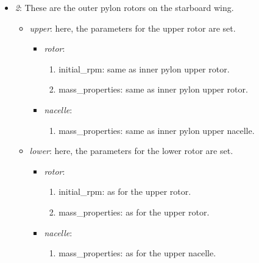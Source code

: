 \documentclass[report]{nrel}
\begin{document}
\begin{itemize}
\begin{itemize}
\begin{itemize}
\begin{itemize}
\begin{enumerate}
				\end{enumerate}
		\end{itemize}
	\end{itemize}
	\item \emph{2}:	These are the outer pylon rotors  on the starboard wing.
	\begin{itemize}
		\item \emph{upper}: here, the parameters for the upper rotor are set.
		\begin{itemize}
			\item \emph{rotor}:
			\begin{enumerate}
				\item {initial\_rpm}: same as inner pylon upper rotor.
				\item {mass\_properties}: same as inner pylon upper rotor. 
			\end{enumerate}
			\item \emph{nacelle}:
			\begin{enumerate}
				\item {mass\_properties}:  same as inner pylon upper nacelle.
			\end{enumerate}
		\end{itemize}
		\item \emph{lower}: here, the parameters for the lower rotor are set.
		\begin{itemize}
			\item \emph{rotor}:
			\begin{enumerate}
				\item {initial\_rpm}: as for the upper rotor.
				\item {mass\_properties}: as for the upper rotor. 
			\end{enumerate}
			\item \emph{nacelle}:
			\begin{enumerate}
				\item {mass\_properties}:  as for the upper nacelle.  
			\end{enumerate}
		\end{itemize}
	\end{itemize}
	
\end{itemize}


\end{itemize}
\end{document}
